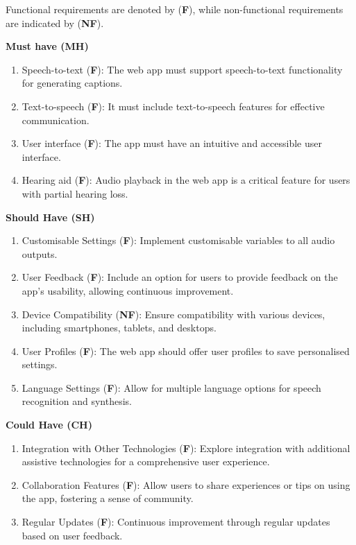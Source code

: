 \documentclass{l4proj}
\begin{document}
Functional requirements are denoted by (\textbf{F}), while non-functional requirements are indicated by (\textbf{NF}).

\textbf{Must have (MH)}
\begin{enumerate}[{MH}.1]
  \item Speech-to-text (\textbf{F}): The web app must support speech-to-text functionality for generating captions.
  \item Text-to-speech (\textbf{F}): It must include text-to-speech features for effective communication.
  \item User interface (\textbf{F}): The app must have an intuitive and accessible user interface.
  \item Hearing aid (\textbf{F}): Audio playback in the web app is a critical feature for users with partial hearing loss.
\end{enumerate}

\textbf{Should Have (SH)}
\begin{enumerate}[{SH}.1]
  \item Customisable Settings (\textbf{F}): Implement customisable variables to all audio outputs.
  \item User Feedback (\textbf{F}): Include an option for users to provide feedback on the app's usability, allowing continuous improvement.
  \item Device Compatibility (\textbf{NF}): Ensure compatibility with various devices, including smartphones, tablets, and desktops.
  \item User Profiles (\textbf{F}): The web app should offer user profiles to save personalised settings.
  \item Language Settings (\textbf{F}): Allow for multiple language options for speech recognition and synthesis.
\end{enumerate}

\textbf{Could Have (CH)}
\begin{enumerate}[{CH}.1]
  \item Integration with Other Technologies (\textbf{F}): Explore integration with additional assistive technologies for a comprehensive user experience.
  \item Collaboration Features (\textbf{F}): Allow users to share experiences or tips on using the app, fostering a sense of community.
  \item Regular Updates (\textbf{F}): Continuous improvement through regular updates based on user feedback.
\end{enumerate}
\end{document}
